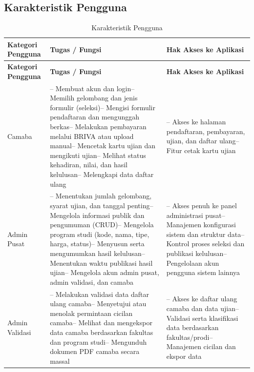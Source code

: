 \subsection{Karakteristik Pengguna} \label{III.KarakteristikPengguna}

\begin{longtable}{|p{}|p{}|p{}|}
	\caption{Karakteristik Pengguna}
	\label{table:3.karakteristikpengguna}\\
	\hline
	\textbf{Kategori Pengguna} & \textbf{Tugas / Fungsi} & \textbf{Hak Akses ke Aplikasi} \\
	\hline
	\endfirsthead
	\hline
	\textbf{Kategori Pengguna} & \textbf{Tugas / Fungsi} & \textbf{Hak Akses ke Aplikasi} \\
	\hline
	\endhead
	Camaba & -- Membuat akun dan login\newline -- Memilih gelombang dan jenis formulir (seleksi)\newline -- Mengisi formulir pendaftaran dan mengunggah berkas\newline -- Melakukan pembayaran melalui BRIVA atau upload manual\newline -- Mencetak kartu ujian dan mengikuti ujian\newline -- Melihat status kehadiran, nilai, dan hasil kelulusan\newline -- Melengkapi data daftar ulang & -- Akses ke halaman pendaftaran, pembayaran, ujian, dan daftar ulang\newline -- Fitur cetak kartu ujian \\
	\hline
	Admin Pusat & -- Menentukan jumlah gelombang, syarat ujian, dan tanggal penting\newline -- Mengelola informasi publik dan pengumuman (CRUD)\newline -- Mengelola program studi (kode, nama, tipe, harga, status)\newline -- Menyusun serta mengumumkan hasil kelulusan\newline -- Menentukan waktu publikasi hasil ujian\newline -- Mengelola akun admin pusat, admin validasi, dan camaba & -- Akses penuh ke panel administrasi pusat\newline -- Manajemen konfigurasi sistem dan struktur data\newline -- Kontrol proses seleksi dan publikasi kelulusan\newline -- Pengelolaan akun pengguna sistem lainnya \\
	\hline
	Admin Validasi & -- Melakukan validasi data daftar ulang camaba\newline -- Menyetujui atau menolak permintaan cicilan camaba\newline -- Melihat dan mengekspor data camaba berdasarkan fakultas dan program studi\newline -- Mengunduh dokumen PDF camaba secara massal & -- Akses ke daftar ulang camaba dan data ujian\newline -- Validasi serta klasifikasi data berdasarkan fakultas/prodi\newline -- Manajemen cicilan dan ekspor data \\
	\hline
\end{longtable}

